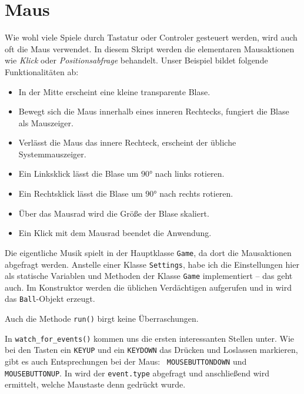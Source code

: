 \newpage
\section{Maus}\label{secMaus}

Wie wohl viele Spiele durch Tastatur oder Controler gesteuert werden, wird auch oft die Maus verwendet. In diesem Skript werden die elementaren Mausaktionen wie \emph{Klick} oder \emph{Positionsabfrage} behandelt. Unser Beispiel bildet folgende Funktionalitäten ab:
\begin{itemize}
	\item In der Mitte erscheint eine kleine transparente Blase.
	\item Bewegt sich die Maus innerhalb eines inneren Rechtecks, fungiert die Blase als Mauszeiger.
	\item Verlässt die Maus das innere Rechteck, erscheint der übliche Systemmauszeiger.
	\item Ein Linksklick lässt die Blase um $90°$ nach links rotieren.
	\item Ein Rechtsklick lässt die Blase um $90°$ nach rechts rotieren.
	\item Über das Mausrad wird die Größe der Blase skaliert.
	\item Ein Klick mit dem Mausrad beendet die Anwendung.
\end{itemize}


Die eigentliche Musik spielt in der Hauptklasse \texttt{Game}, da dort die Mausaktionen abgefragt werden. Anstelle einer Klasse \texttt{Settings}, habe ich die Einstellungen hier als statische Variablen und Methoden der Klasse \texttt{Game} implementiert -- das geht auch. Im Konstruktor werden die üblichen Verdächtigen aufgerufen und in  wird das \texttt{Ball}-Objekt erzeugt.

\newpage


Auch die Methode \texttt{run()} birgt keine Überraschungen.


In \texttt{watch\_for\_events()} kommen uns die ersten interessanten Stellen unter. Wie bei den Tasten ein \texttt{KEYUP} und ein \texttt{KEYDOWN} das Drücken und Loslassen markieren, gibt es auch Entsprechungen bei der Maus:\  \texttt{MOUSEBUTTONDOWN} und \texttt{MOUSEBUTTONUP}. In  wird der \texttt{event.type} abgefragt und anschließend wird ermittelt, welche Maustaste denn gedrückt wurde. 

